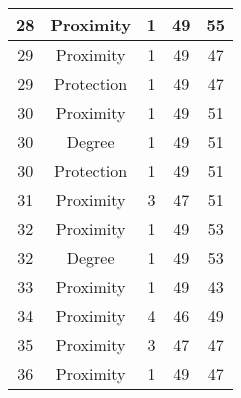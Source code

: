 \documentclass[results.tex]{subfiles}
\begin{document}
\begin{center}
\begin{tabular}{| c || c | c | c | c |}
            \hline
            28                      & Proximity                    & 1                      & 49                      & 55                   \\
            \hline
            29                      & Proximity                    & 1                      & 49                      & 47                   \\
            \hline
            29                      & Protection                   & 1                      & 49                      & 47                   \\
            \hline
            30                      & Proximity                    & 1                      & 49                      & 51                   \\
            \hline
            30                      & Degree                       & 1                      & 49                      & 51                   \\
            \hline
            30                      & Protection                   & 1                      & 49                      & 51                   \\
            \hline
            31                      & Proximity                    & 3                      & 47                      & 51                   \\
            \hline
            32                      & Proximity                    & 1                      & 49                      & 53                   \\
            \hline
            32                      & Degree                       & 1                      & 49                      & 53                   \\
            \hline
            33                      & Proximity                    & 1                      & 49                      & 43                   \\
            \hline
            34                      & Proximity                    & 4                      & 46                      & 49                   \\
            \hline
            35                      & Proximity                    & 3                      & 47                      & 47                   \\
            \hline
            36                      & Proximity                    & 1                      & 49                      & 47                   \\

\end{tabular}
\end{center}
\end{document}

